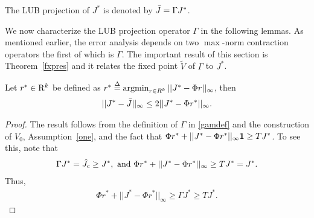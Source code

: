 \begin{definition}\label{bestproj}
The LUB projection of $J^*$ is denoted by $\bar{J}=\Gamma J^*$.
\end{definition}
We now characterize the LUB projection operator $\Gamma$ in the following lemmas. 
As mentioned earlier, the error analysis depends on two $\max$-norm contraction operators the first of which is $\Gamma$. The important result of this section is Theorem~\ref{fxpres} and it relates the fixed point $\tilde{V}$ of $\Gamma$ to $J^*$.
\begin{lemma}\label{bestbnd}
Let $r^*\in \mathrm{R}^k$ be defined as $r^*\stackrel{\Delta}{=}\operatorname{argmin}_{r\in R^k}||J^*-\Phi r||_\infty$, then 
\begin{align}
||J^*-\bar{J}||_\infty\leq 2||J^*-\Phi r^*||_\infty.
\end{align}
\end{lemma}
\begin{proof}
The result follows from the definition of $\Gamma$ in \eqref{gamdef} and the construction of $V_0$, Assumption~\ref{one}, and the fact that $\Phi r^*+||J^*-\Phi r^*||_\infty \mathbf{1}\geq TJ^*$. To see this, note that
\begin{align}
\Gamma J^*=\hat{J}_c \geq J^*,\nonumber \text{ and }
\Phi r^* +||J^*-\Phi r^*||_\infty\geq TJ^*= J^*.\nonumber
\end{align}
Thus,
\begin{align}
\Phi r^* +||J^*-\Phi r^*||_\infty\geq \Gamma J^*\geq TJ^*.
\end{align}
\end{proof}

